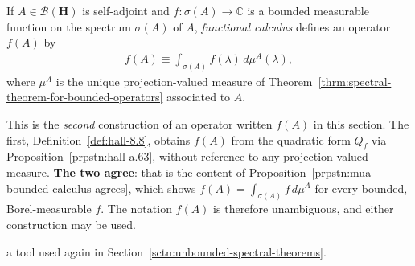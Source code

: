 \begin{definition}
    \label{def:functional-calculus}
    \leanok
    If $A \in \mathcal{B}(\mathbf{H})$ is self-adjoint and $f : \sigma(A) \rightarrow \mathbb{C}$ is a bounded measurable function on the spectrum $\sigma(A)$ of $A$, \textit{functional calculus} defines an operator $f(A)$ by
    \begin{align}
        f(A) \equiv \int_{\sigma(A)} f(\lambda) \, d\mu^A(\lambda),
    \end{align}
    where $\mu^A$ is the unique projection-valued measure of Theorem~\ref{thrm:spectral-theorem-for-bounded-operators} associated to $A$.

    This is the \textit{second} construction of an operator written $f(A)$ in this section. The first, Definition~\ref{def:hall-8.8}, obtains $f(A)$ from the quadratic form $Q_f$ via Proposition~\ref{prpstn:hall-a.63}, without reference to any projection-valued measure. \textbf{The two agree}: that is the content of Proposition~\ref{prpstn:mua-bounded-calculus-agrees}, which shows $f(A) = \int_{\sigma(A)} f \, d\mu^A$ for every bounded, Borel-measurable $f$. The notation $f(A)$ is therefore unambiguous, and either construction may be used.
\end{definition}

a tool used again in Section~\ref{sctn:unbounded-spectral-theorems}.
